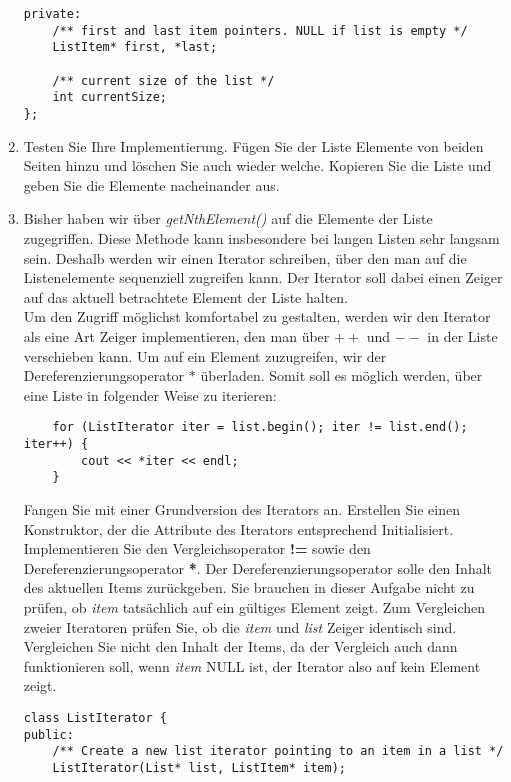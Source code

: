 \documentclass[
  accentcolor=tud1c,	%
  colorbacktitle,		%
  inverttitle,			%
  german,				%
  twoside
]{tudexercise}
\begin{document}
\begin{enumerate}
\begin{lstlisting}
private:
	/** first and last item pointers. NULL if list is empty */
	ListItem* first, *last;
	
	/** current size of the list */
	int currentSize;
};
\end{lstlisting}

\item Testen Sie Ihre Implementierung. Fügen Sie der Liste Elemente von beiden Seiten hinzu und löschen Sie auch wieder welche. Kopieren Sie die Liste und geben Sie die Elemente nacheinander aus.

\item Bisher haben wir über \emph{getNthElement()} auf die Elemente der Liste zugegriffen. Diese Methode kann insbesondere bei langen Listen sehr langsam sein. Deshalb werden wir einen Iterator schreiben, über den man auf die Listenelemente sequenziell zugreifen kann. Der Iterator soll dabei einen Zeiger auf das aktuell betrachtete Element der Liste halten. \\

Um den Zugriff möglichst komfortabel zu gestalten, werden wir den Iterator als eine Art Zeiger implementieren, den man über \textbf{$++$} und \textbf{$--$} in der Liste verschieben kann. Um auf ein Element zuzugreifen, wir der Dereferenzierungsoperator $*$ überladen. Somit soll es möglich werden, über eine Liste in folgender Weise zu iterieren: \\
\begin{lstlisting}
	for (ListIterator iter = list.begin(); iter != list.end(); iter++) {
		cout << *iter << endl;
	}
\end{lstlisting}

Fangen Sie mit einer Grundversion des Iterators an. Erstellen Sie einen Konstruktor, der die Attribute des Iterators entsprechend Initialisiert. Implementieren Sie den Vergleichsoperator \textbf{!=} sowie den Dereferenzierungsoperator \textbf{*}. Der Dereferenzierungsoperator solle den Inhalt des aktuellen Items zurückgeben. Sie brauchen in dieser Aufgabe nicht zu prüfen, ob \emph{item} tatsächlich auf ein gültiges Element zeigt. Zum Vergleichen zweier Iteratoren prüfen Sie, ob die \emph{item} und \emph{list} Zeiger identisch sind. Vergleichen Sie nicht den Inhalt der Items, da der Vergleich auch dann funktionieren soll, wenn \emph{item} NULL ist, der Iterator also auf kein Element zeigt.  \\

\begin{lstlisting}
class ListIterator {
public:
	/** Create a new list iterator pointing to an item in a list */
	ListIterator(List* list, ListItem* item);


\end{lstlisting}
\end{enumerate}
\end{document}
